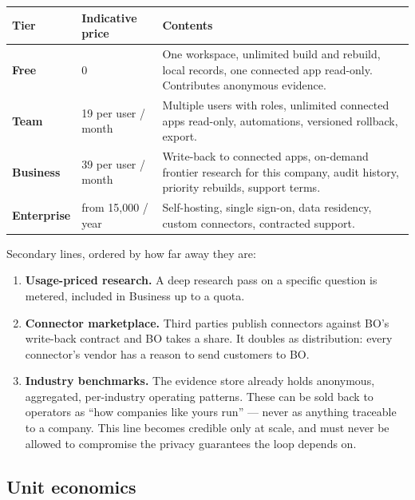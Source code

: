 \documentclass[11pt,a4paper]{article}
\newcommand{\eur}{\texteuro}
\begin{document}
\begin{center}
\small
\begin{tabular}{@{}l l p{6.4cm}@{}}
\toprule
\textbf{Tier} & \textbf{Indicative price} & \textbf{Contents} \\
\midrule
\textbf{Free}       & \eur{}0
& One workspace, unlimited build and rebuild, local records, one connected app read-only.
  Contributes anonymous evidence. \\[3pt]
\textbf{Team}       & \eur{}19 per user / month
& Multiple users with roles, unlimited connected apps read-only, automations, versioned rollback,
  export. \\[3pt]
\textbf{Business}   & \eur{}39 per user / month
& Write-back to connected apps, on-demand frontier research for this company, audit history,
  priority rebuilds, support terms. \\[3pt]
\textbf{Enterprise} & from \eur{}15{,}000 / year
& Self-hosting, single sign-on, data residency, custom connectors, contracted support. \\
\bottomrule
\end{tabular}
\end{center}

Secondary lines, ordered by how far away they are:

\begin{enumerate}[leftmargin=1.6em,itemsep=3pt]
  \item \textbf{Usage-priced research.} A deep research pass on a specific question is metered,
        included in Business up to a quota.
  \item \textbf{Connector marketplace.} Third parties publish connectors against BO's write-back
        contract and BO takes a share. It doubles as distribution: every connector's vendor has a
        reason to send customers to BO.
  \item \textbf{Industry benchmarks.} The evidence store already holds anonymous, aggregated,
        per-industry operating patterns. These can be sold back to operators as ``how companies like
        yours run'' --- never as anything traceable to a company. This line becomes credible only at
        scale, and must never be allowed to compromise the privacy guarantees the loop depends on.
\end{enumerate}

\subsection{Unit economics}
\end{document}

